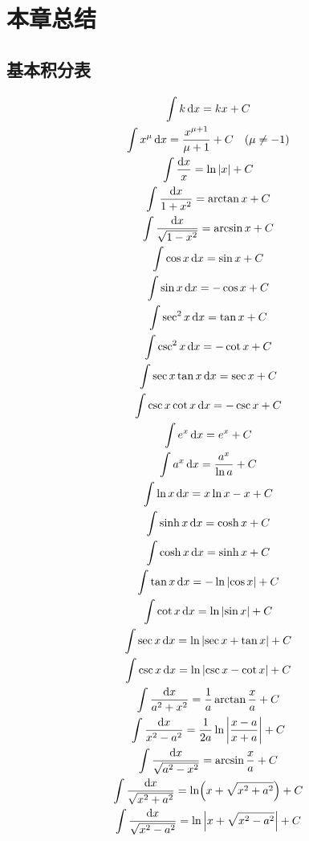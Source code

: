 \section{本章总结}
\subsection{基本积分表}
\begin{gather*}
	\int k \dd{x}
	= kx + C \\
	\int x^\mu \dd{x}
	= \frac{x^{\mu + 1}}{\mu + 1} + C \quad (\mu \neq -1) \\
	\int \frac{\dd{x}}{x}
	= \ln\abs{x} + C \\
	\int \frac{\dd{x}}{1 + x^2}
	= \arctan x + C \\
	\int \frac{\dd{x}}{\sqrt{1 - x^2}}
	= \arcsin x + C \\
	\int \cos x \dd{x}
	= \sin x + C \\
	\int \sin x \dd{x}
	= -\cos x + C \\
	\int \sec^2 x \dd{x}
	= \tan x + C \\
	\int \csc^2 x \dd{x}
	= -\cot x + C \\
	\int \sec x \tan x \dd{x}
	= \sec x + C \\
	\int \csc x \cot x \dd{x}
	= -\csc x + C \\
	\int e^x \dd{x}
	= e^x + C \\
	\int a^x \dd{x}
	= \frac{a^x}{\ln a} + C \\
	\int \ln x \dd{x}
	= x \ln x - x + C \\
	\int \sinh x \dd{x}
	= \cosh x + C \\
	\int \cosh x \dd{x}
	= \sinh x + C \\
	\int \tan x \dd{x}
	= -\ln\abs{\cos x} + C \\
	\int \cot x \dd{x}
	= \ln\abs{\sin x} + C \\
	\int \sec x \dd{x}
	= \ln\abs{\sec x + \tan x} + C \\
	\int \csc x \dd{x}
	= \ln\abs{\csc x - \cot x} + C \\
	\int \frac{\dd{x}}{a^2 + x^2}
	= \frac{1}{a} \arctan\frac{x}{a} + C \\
	\int \frac{\dd{x}}{x^2 - a^2}
	= \frac{1}{2a} \ln\abs{\frac{x - a}{x + a}} + C \\
	\int \frac{\dd{x}}{\sqrt{a^2 - x^2}}
	= \arcsin\frac{x}{a} + C \\
	\int \frac{\dd{x}}{\sqrt{x^2 + a^2}}
	= \ln(x + \sqrt{x^2 + a^2}) + C \\
	\int \frac{\dd{x}}{\sqrt{x^2 - a^2}}
	= \ln\abs{x + \sqrt{x^2 - a^2}} + C
\end{gather*}

